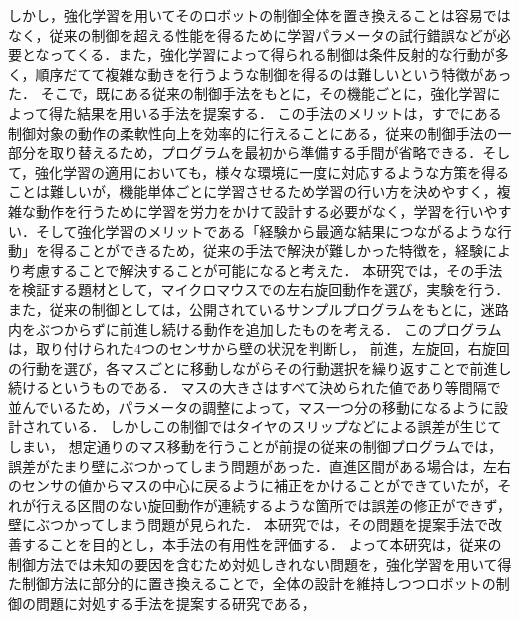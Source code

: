 \documentclass[a4paper,11pt]{jsarticle}
\begin{document}
しかし，強化学習を用いてそのロボットの制御全体を置き換えることは容易ではなく，従来の制御を超える性能を得るために学習パラメータの試行錯誤などが必要となってくる．また，強化学習によって得られる制御は条件反射的な行動が多く，順序だてて複雑な動きを行うような制御を得るのは難しいという特徴\cite{遺伝的プログラミングと強化学習の統合に基づく実ロボットの行動獲得}があった．
そこで，既にある従来の制御手法をもとに，その機能ごとに，強化学習によって得た結果を用いる手法を提案する．
この手法のメリットは，すでにある制御対象の動作の柔軟性向上を効率的に行えることにある，従来の制御手法の一部分を取り替えるため，プログラムを最初から準備する手間が省略できる．そして，強化学習の適用においても，様々な環境に一度に対応するような方策を得ることは難しいが，機能単体ごとに学習させるため学習の行い方を決めやすく，複雑な動作を行うために学習を労力をかけて設計する必要がなく，学習を行いやすい．そして強化学習のメリットである「経験から最適な結果につながるような行動」を得ることができるため，従来の手法で解決が難しかった特徴を，経験により考慮することで解決することが可能になると考えた．
本研究では，その手法を検証する題材として，マイクロマウスでの左右旋回動作を選び，実験を行う．%
また，従来の制御としては，公開されているサンプルプログラムをもとに，迷路内をぶつからずに前進し続ける動作を追加したものを考える．
このプログラムは，取り付けられた4つのセンサから壁の状況を判断し，
前進，左旋回，右旋回の行動を選び，各マスごとに移動しながらその行動選択を繰り返すことで前進し続けるというものである．
マスの大きさはすべて決められた値であり等間隔で並んでいるため，パラメータの調整によって，マス一つ分の移動になるように設計されている．
しかしこの制御ではタイヤのスリップなどによる誤差が生じてしまい，
想定通りのマス移動を行うことが前提の従来の制御プログラムでは，誤差がたまり壁にぶつかってしまう問題があった．直進区間がある場合は，左右のセンサの値からマスの中心に戻るように補正をかけることができていたが，それが行える区間のない旋回動作が連続するような箇所では誤差の修正ができず，壁にぶつかってしまう問題が見られた．
本研究では，その問題を提案手法で改善することを目的とし，本手法の有用性を評価する．
よって本研究は，従来の制御方法では未知の要因を含むため対処しきれない問題を，強化学習を用いて得た制御方法に部分的に置き換えることで，全体の設計を維持しつつロボットの制御の問題に対処する手法を提案する研究である，
\end{document}
